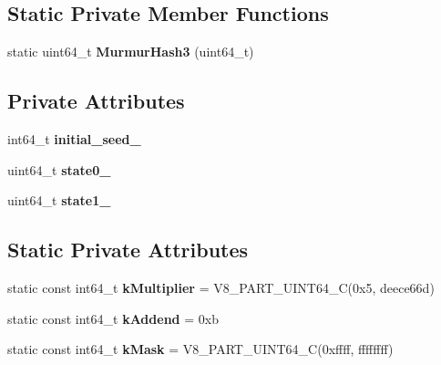 \subsection*{Static Private Member Functions}
\begin{DoxyCompactItemize}
\item 
static uint64\+\_\+t {\bfseries Murmur\+Hash3} (uint64\+\_\+t)\hypertarget{classv8_1_1base_1_1_random_number_generator_ac780ac819aabd925ed250e66dc00a6b8}{}\label{classv8_1_1base_1_1_random_number_generator_ac780ac819aabd925ed250e66dc00a6b8}

\end{DoxyCompactItemize}
\subsection*{Private Attributes}
\begin{DoxyCompactItemize}
\item 
int64\+\_\+t {\bfseries initial\+\_\+seed\+\_\+}\hypertarget{classv8_1_1base_1_1_random_number_generator_a7e31ab8773dc8d0c526d7615ab558f0e}{}\label{classv8_1_1base_1_1_random_number_generator_a7e31ab8773dc8d0c526d7615ab558f0e}

\item 
uint64\+\_\+t {\bfseries state0\+\_\+}\hypertarget{classv8_1_1base_1_1_random_number_generator_af67af3ca8628f5f93ae7873900a4c1b3}{}\label{classv8_1_1base_1_1_random_number_generator_af67af3ca8628f5f93ae7873900a4c1b3}

\item 
uint64\+\_\+t {\bfseries state1\+\_\+}\hypertarget{classv8_1_1base_1_1_random_number_generator_ae78e49a0715becf7a38c157ea07e2486}{}\label{classv8_1_1base_1_1_random_number_generator_ae78e49a0715becf7a38c157ea07e2486}

\end{DoxyCompactItemize}
\subsection*{Static Private Attributes}
\begin{DoxyCompactItemize}
\item 
static const int64\+\_\+t {\bfseries k\+Multiplier} = V8\+\_\+P\+A\+R\+T\+\_\+\+U\+I\+N\+T64\+\_\+C(0x5, deece66d)\hypertarget{classv8_1_1base_1_1_random_number_generator_a2afb7b0d0c2435852767e5583b414771}{}\label{classv8_1_1base_1_1_random_number_generator_a2afb7b0d0c2435852767e5583b414771}

\item 
static const int64\+\_\+t {\bfseries k\+Addend} = 0xb\hypertarget{classv8_1_1base_1_1_random_number_generator_a1535ca3c8b973fdf97d9dcb4c5a148e6}{}\label{classv8_1_1base_1_1_random_number_generator_a1535ca3c8b973fdf97d9dcb4c5a148e6}

\item 
static const int64\+\_\+t {\bfseries k\+Mask} = V8\+\_\+P\+A\+R\+T\+\_\+\+U\+I\+N\+T64\+\_\+C(0xffff, ffffffff)\hypertarget{classv8_1_1base_1_1_random_number_generator_a9bc5a6545157c217eb56c71cc651e041}{}\label{classv8_1_1base_1_1_random_number_generator_a9bc5a6545157c217eb56c71cc651e041}

\end{DoxyCompactItemize}


